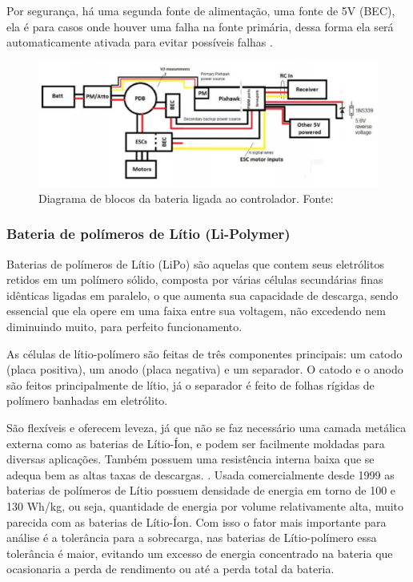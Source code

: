Por segurança, há uma segunda fonte de alimentação, 
uma fonte de 5V (BEC), ela é para casos onde houver uma falha na fonte primária, dessa forma ela será automaticamente ativada para evitar 
possíveis falhas \cite{pix}.

\begin{figure}[H]
    \centering
	\includegraphics[keepaspectratio=true,scale=0.8]{figuras/esquemabateria.eps}
    \caption{Diagrama de blocos da bateria ligada ao controlador. Fonte: \cite{pixhawk}}
    \label{fig:esquemabateria}
\end{figure}


\subsubsection{Bateria de polímeros de Lítio (Li-Polymer)}

Baterias de polímeros de Lítio (LiPo) são aquelas que contem seus eletrólitos retidos em um polímero sólido, 
composta por várias células secundárias finas idênticas ligadas em paralelo, o que aumenta sua capacidade de 
descarga, sendo essencial que ela opere em uma faixa entre sua voltagem, não excedendo nem diminuindo muito, para perfeito funcionamento. \cite{gibbs}

As células de lítio-polímero são feitas de três componentes principais: um catodo (placa positiva), um anodo 
(placa negativa) e um separador. O catodo e o anodo são feitos principalmente de lítio, já o separador é feito 
de folhas rígidas de polímero banhadas em eletrólito. \cite{gibbs}

São flexíveis e oferecem leveza, já que não se faz necessário uma camada metálica externa como as baterias de 
Lítio-Íon, e podem ser facilmente moldadas para diversas aplicações. Também possuem uma resistência interna 
baixa que se adequa bem as altas taxas de descargas. \cite{costa}. Usada comercialmente desde 1999 as baterias 
de polímeros de Lítio possuem densidade de energia em torno de 100 e 130 Wh/kg, ou seja, quantidade de energia 
por volume relativamente alta, muito parecida com as baterias de Lítio-Íon. Com isso o fator mais importante para
análise é a tolerância para a sobrecarga, nas baterias de Lítio-polímero essa tolerância é maior, evitando um 
excesso de energia concentrado na bateria que ocasionaria a perda de rendimento ou até a perda total da bateria.
\cite{costa}


